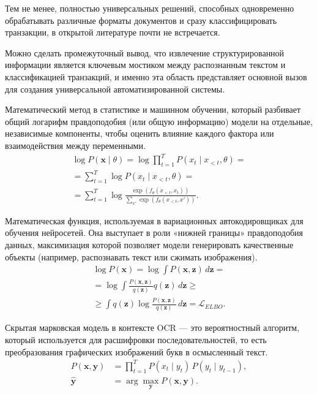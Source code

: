 \documentclass[14pt,a4paper]{extarticle}
\begin{document}
Тем не менее, полностью универсальных решений, способных одновременно обрабатывать различные форматы документов и сразу классифицировать транзакции, в открытой литературе почти не встречается.

Можно сделать промежуточный вывод, что извлечение структурированной информации является ключевым мостиком между распознанным текстом и классификацией транзакций, и именно эта область представляет основной вызов для создания универсальной автоматизированной системы.

Математический метод в статистике и машинном обучении, который разбивает общий логарифм правдоподобия (или общую информацию) модели на отдельные, независимые компоненты, чтобы оценить влияние каждого фактора или взаимодействия между переменными.
\begin{multline*}
\log P(\mathbf{x} \mid \theta) = \log \prod_{t=1}^{T} P(x_t \mid x_{<t}, \theta) = \\
= \sum_{t=1}^{T} \log P(x_t \mid x_{<t}, \theta) = \\
= \sum_{t=1}^{T} \log \frac{\exp(f_\theta(x_{<t}, x_t))}{\sum_{x'} \exp(f_\theta(x_{<t}, x'))}.
\end{multline*}


Математическая функция, используемая в вариационных автокодировщиках для обучения нейросетей. Она выступает в роли «нижней границы» правдоподобия данных, максимизация которой позволяет модели генерировать качественные объекты (например, распознавать текст или сжимать изображения).
\begin{multline*}
\log P(\mathbf{x})
= \log \int P(\mathbf{x}, \mathbf{z})\, d\mathbf{z} = \\
= \log \int \frac{P(\mathbf{x}, \mathbf{z})}{q(\mathbf{z})} q(\mathbf{z})\, d\mathbf{z} \ge \\
\ge \int q(\mathbf{z}) \log \frac{P(\mathbf{x}, \mathbf{z})}{q(\mathbf{z})}\, d\mathbf{z} = \mathcal{L}_{ELBO}.
\end{multline*}

Скрытая марковская модель в контексте OCR — это вероятностный алгоритм, который используется для расшифровки последовательностей, то есть преобразования графических изображений букв в осмысленный текст.
\begin{align*}
P(\mathbf{x}, \mathbf{y}) &= \prod_{t=1}^{T} P(x_t \mid y_t)\, P(y_t \mid y_{t-1}), \\
\hat{\mathbf{y}} &= \arg\max_{\mathbf{y}} P(\mathbf{x}, \mathbf{y}).
\end{align*}
\end{document}
